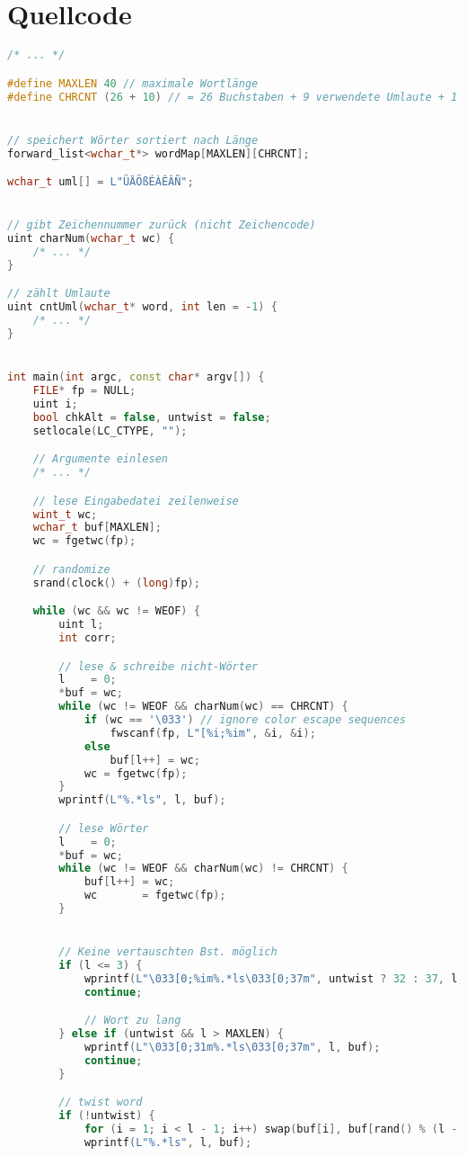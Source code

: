 \documentclass[a4paper,10pt,ngerman]{scrartcl}
\newcommand{\newsection}{\vspace{3\baselineskip}\section}
\begin{document}
\pagebreak
\newsection{Quellcode}

\begin{lstlisting}[language=C++]
/* ... */

#define MAXLEN 40 // maximale Wortlänge
#define CHRCNT (26 + 10) // = 26 Buchstaben + 9 verwendete Umlaute + 1 für andere Sonderzeichen/Umlaute


// speichert Wörter sortiert nach Länge
forward_list<wchar_t*> wordMap[MAXLEN][CHRCNT];

wchar_t uml[] = L"ÜÄÖßÉÀÊÂÑ";


// gibt Zeichennummer zurück (nicht Zeichencode)
uint charNum(wchar_t wc) {
    /* ... */
}

// zählt Umlaute
uint cntUml(wchar_t* word, int len = -1) {
    /* ... */
}


int main(int argc, const char* argv[]) {
    FILE* fp = NULL;
    uint i;
    bool chkAlt = false, untwist = false;
    setlocale(LC_CTYPE, "");

    // Argumente einlesen
    /* ... */

    // lese Eingabedatei zeilenweise
    wint_t wc;
    wchar_t buf[MAXLEN];
    wc = fgetwc(fp);

    // randomize
    srand(clock() + (long)fp);

    while (wc && wc != WEOF) {
        uint l;
        int corr;

        // lese & schreibe nicht-Wörter
        l    = 0;
        *buf = wc;
        while (wc != WEOF && charNum(wc) == CHRCNT) {
            if (wc == '\033') // ignore color escape sequences
                fwscanf(fp, L"[%i;%im", &i, &i);
            else
                buf[l++] = wc;
            wc = fgetwc(fp);
        }
        wprintf(L"%.*ls", l, buf);

        // lese Wörter
        l    = 0;
        *buf = wc;
        while (wc != WEOF && charNum(wc) != CHRCNT) {
            buf[l++] = wc;
            wc       = fgetwc(fp);
        }


        // Keine vertauschten Bst. möglich
        if (l <= 3) {
            wprintf(L"\033[0;%im%.*ls\033[0;37m", untwist ? 32 : 37, l, buf);
            continue;

            // Wort zu lang
        } else if (untwist && l > MAXLEN) {
            wprintf(L"\033[0;31m%.*ls\033[0;37m", l, buf);
            continue;
        }

        // twist word
        if (!untwist) {
            for (i = 1; i < l - 1; i++) swap(buf[i], buf[rand() % (l - 2) + 1]);
            wprintf(L"%.*ls", l, buf);


\end{lstlisting}
\end{document}
